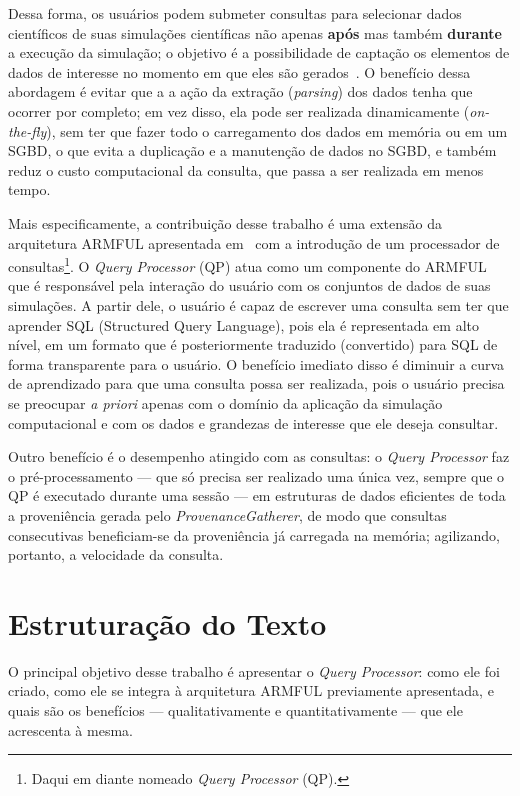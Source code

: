 Dessa forma, os usuários podem submeter consultas para selecionar dados científicos de suas simulações científicas não apenas \textbf{após} mas também \textbf{durante} a execução da simulação; o objetivo é a possibilidade de captação os elementos de dados de interesse no momento em que eles são gerados~\cite{silva2015analyzing}. O benefício dessa abordagem é evitar que a a ação da extração (\textit{parsing}) dos dados tenha que ocorrer por completo; em vez disso, ela pode ser realizada dinamicamente (\textit{on-the-fly}), sem ter que fazer todo o carregamento dos dados em memória ou em um SGBD, o que evita a duplicação e a manutenção de dados no SGBD, e também reduz o custo computacional da consulta, que passa a ser realizada em menos tempo.

Mais especificamente, a contribuição desse trabalho é uma extensão da arquitetura ARMFUL apresentada em~\cite{silva2016situ,silva2017raw} com a introdução de um processador de consultas\footnote{Daqui em diante nomeado \textit{Query Processor} (QP).}.
O  \textit{Query Processor} (QP) atua como um componente do ARMFUL que é responsável pela interação do usuário com os conjuntos de dados de suas simulações. A partir dele, o usuário é capaz de escrever uma consulta sem ter que aprender  SQL (Structured Query Language), pois ela é representada em alto nível, em um formato que é posteriormente traduzido (convertido) para SQL de forma transparente para o usuário. O benefício imediato disso é diminuir a curva de aprendizado para que uma consulta possa ser realizada, pois o usuário precisa se preocupar \textit{a priori} apenas com o domínio da aplicação da simulação computacional e com os dados e grandezas de interesse que ele deseja consultar.

Outro benefício é o desempenho atingido com as consultas: o \textit{Query Processor} faz o pré-processamento --- que só precisa ser realizado uma única vez, sempre que o QP é executado durante uma sessão --- em estruturas de dados eficientes de toda a proveniência gerada pelo \textit{ProvenanceGatherer}, de modo que consultas consecutivas beneficiam-se da proveniência já carregada na memória; agilizando, portanto, a velocidade da consulta.

\section{Estruturação do Texto}

O principal objetivo desse trabalho é apresentar o \textit{Query Processor}: como ele foi criado, como ele se integra à arquitetura ARMFUL previamente apresentada, e quais são os benefícios --- qualitativamente e quantitativamente --- que ele acrescenta à mesma.

